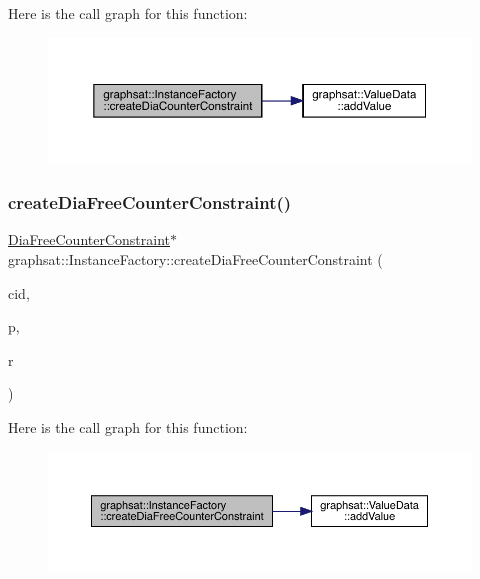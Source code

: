 Here is the call graph for this function\+:
\nopagebreak
\begin{figure}[H]
\begin{center}
\leavevmode
\includegraphics[width=350pt]{classgraphsat_1_1_instance_factory_a3a7fcb2873970201601471c4cdbeeeff_cgraph}
\end{center}
\end{figure}
\mbox{\label{classgraphsat_1_1_instance_factory_a1b318d873913d4a12ea15b91e12e6b30}} 
\subsubsection{\texorpdfstring{createDiaFreeCounterConstraint()}{createDiaFreeCounterConstraint()}}
{\footnotesize\ttfamily \mbox{\hyperlink{classgraphsat_1_1_dia_free_counter_constraint}{Dia\+Free\+Counter\+Constraint}}$\ast$ graphsat\+::\+Instance\+Factory\+::create\+Dia\+Free\+Counter\+Constraint (\begin{DoxyParamCaption}\item[{int}]{cid,  }\item[{\mbox{\hyperlink{namespacegraphsat_acfb5939f9bdafbd9aea0d084b9a56f69}{C\+O\+M\+P\+\_\+\+O\+P\+E\+R\+A\+T\+OR}}}]{p,  }\item[{int}]{r }\end{DoxyParamCaption})\hspace{0.3cm}{\ttfamily [inline]}}

Here is the call graph for this function\+:
\nopagebreak
\begin{figure}[H]
\begin{center}
\leavevmode
\includegraphics[width=350pt]{classgraphsat_1_1_instance_factory_a1b318d873913d4a12ea15b91e12e6b30_cgraph}
\end{center}
\end{figure}
\mbox{\label{classgraphsat_1_1_instance_factory_a368a7bc5de4eae0d19b631e12f88e00d}} 
